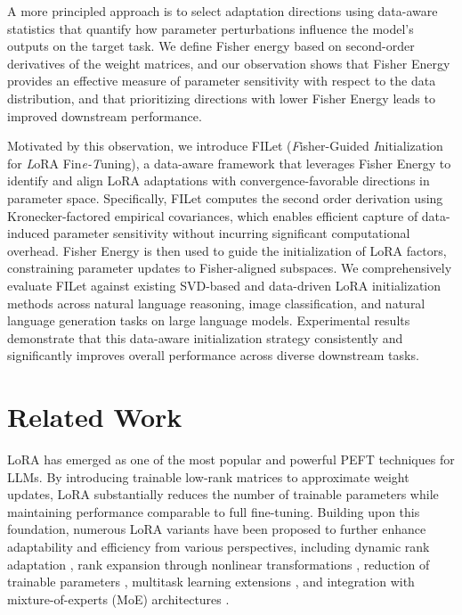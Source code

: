 \documentclass{article}
\theoremstyle{plain}
\theoremstyle{definition}
\theoremstyle{remark}
\begin{document}
A more principled approach is to select adaptation directions using data-aware statistics that quantify how parameter perturbations influence the model's outputs on the target task. We define Fisher energy based on second-order derivatives of the weight matrices, and our observation shows that Fisher Energy provides an effective measure of parameter sensitivity with respect to the data distribution, and that prioritizing directions with lower Fisher Energy leads to improved downstream performance. 

Motivated by this observation, we introduce FILet (\emph{F}isher-Guided \emph{I}nitialization for \emph{L}oRA Fin\emph{e-T}uning), a data-aware framework that leverages Fisher Energy to identify and align LoRA adaptations with convergence-favorable directions in parameter space. Specifically, FILet computes the second order derivation using Kronecker-factored empirical covariances, which enables efficient capture of data-induced parameter sensitivity without incurring significant computational overhead. Fisher Energy is then used to guide the initialization of LoRA factors, constraining parameter updates to Fisher-aligned subspaces. We comprehensively evaluate FILet against existing SVD-based \cite{PISSA, MILORA, KASA} and data-driven LoRA initialization methods \cite{LORADASH} across natural language reasoning, image classification, and natural language generation tasks on large language models. Experimental results demonstrate that this data-aware initialization strategy consistently and significantly improves overall performance across diverse downstream tasks.



\section{Related Work}


LoRA \cite{LORA} has emerged as one of the most popular and powerful PEFT techniques for LLMs. By introducing trainable low-rank matrices to approximate weight updates, LoRA substantially reduces the number of trainable parameters while maintaining performance comparable to full fine-tuning. Building upon this foundation, numerous LoRA variants have been proposed to further enhance adaptability and efficiency from various perspectives, including dynamic rank adaptation \cite{ADALORA}, rank expansion through nonlinear transformations \cite{SINELORA}, reduction of trainable parameters \cite{VERA, UoRA}, multitask learning extensions \cite{MTLLORA, LORI}, and integration with mixture-of-experts (MoE) architectures \cite{HYDRALORA, MOLORA, GOAT}.
\end{document}

